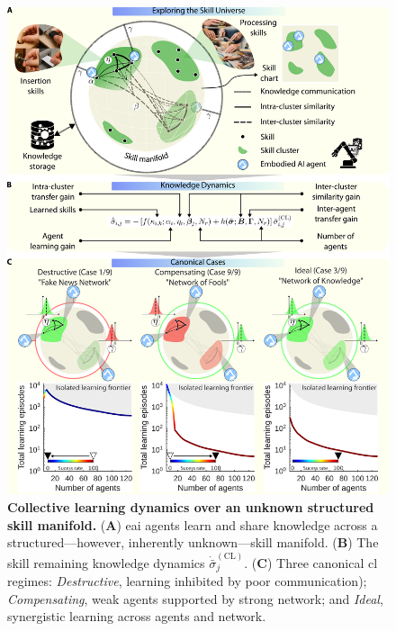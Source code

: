 \documentclass[12pt]{article}
\begin{document}
\begin{figure}[t!]
	\centering
	\hspace*{\fill}
	\includegraphics[width=13cm]{collective_learning_and_skill_manifold_conceptualization.png}
	\hspace*{\fill}
    \caption{\label{fig:collective_learning_and_skill_manifold_conceptualization} 
    	\textbf{Collective learning dynamics over an unknown structured skill manifold.} 
    	(\textbf{A}) \ac{eai} agents learn and share knowledge across a structured---however, inherently unknown---skill manifold. (\textbf{B}) The skill remaining knowledge dynamics $\dot{\bar{\sigma}}^{(\mathrm{CL})}_j$. (\textbf{C}) Three canonical \ac{cl} regimes: \textit{Destructive}, learning inhibited by poor communication); \textit{Compensating}, weak agents supported by strong network; and \textit{Ideal}, synergistic learning across agents and network.        
    }
\end{figure}
\end{document}
